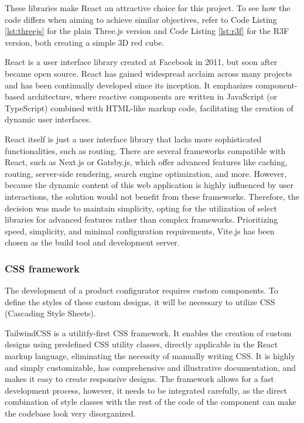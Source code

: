 These libraries make React an attractive choice for this project. To see how the code differs when aiming to achieve similar objectives, refer to Code Listing \ref{lst:threejs} for the plain Three.js version and Code Listing \ref{lst:r3f} for the R3F version, both creating a simple 3D red cube.

React is a user interface library created at Facebook in 2011, but soon after became open source. React has gained widespread acclaim across many projects and has been continually developed since its inception. It emphasizes component-based architecture, where reactive components are written in JavaScript (or TypeScript) combined with HTML-like markup code, facilitating the creation of dynamic user interfaces. \cite{Banks2020}

React itself is just a user interface library that lacks more sophisticated functionalities, such as routing. There are several frameworks compatible with React, such as Next.js or Gatsby.js, which offer advanced features like caching, routing, server-side rendering, search engine optimization, and more. However, because the dynamic content of this web application is highly influenced by user interactions, the solution would not benefit from these frameworks. \cite{Eze2023} Therefore, the decision was made to maintain simplicity, opting for the utilization of select libraries for advanced features rather than complex frameworks. Prioritizing speed, simplicity, and minimal configuration requirements, Vite.js has been chosen as the build tool and development server. \cite{Said2023}

\subsubsection{CSS framework}
The development of a product configurator requires custom components. To define the styles of these custom designs, it will be necessary to utilize CSS (Cascading Style Sheets).

TailwindCSS is a utilitfy-first CSS framework. It enables the creation of custom designs using predefined CSS utility classes, directly applicable in the React markup language, eliminating the necessity of manually writing CSS. It is highly and simply customizable, has comprehensive and illustrative documentation, and makes it easy to create responsive designs. The framework allows for a fast development process, however, it needs to be integrated carefully, as the direct combination of style classes with the rest of the code of the component can make the codebase look very disorganized. \cite{TailwindCSS}

